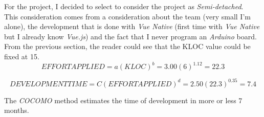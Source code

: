 For the project, I decided to select to consider the project as \textit{Semi-detached}.\\
This consideration comes from a consideration about the team (very small I'm alone), the development that is done with \textit{Vue Native} (first time with \textit{Vue Native} but I already know \textit{Vue.js}) and the fact that I never program an \textit{Arduino} board.\\

From the previous section, the reader could see that the KLOC value could be fixed at 15.\\

\[
EFFORT APPLIED = a\left ( KLOC \right ) ^{b} =  3.00 \left ( 6 \right ) ^{1.12} = 22.3
\]

\[
DEVELOPMENT TIME = C\left ( EFFORT APPLIED \right ) ^{d} =  2.50 \left ( 22.3 \right ) ^{0.35} = 7.4
\]

The \textit{COCOMO} method estimates the time of development in more or less 7 months.

